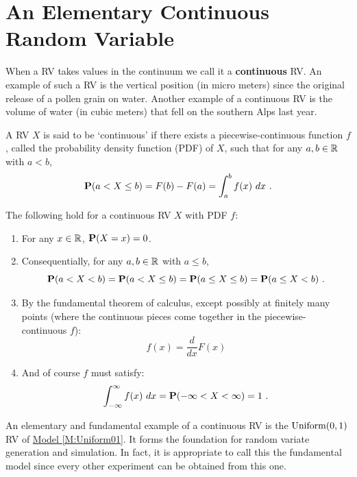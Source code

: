 \section{An Elementary Continuous Random Variable}\label{S:ElemContRV}

When a RV takes values in the continuum we call it a {\bf continuous} RV.  An example of such a RV is the vertical position (in micro meters) since the original release of a pollen grain on water.  Another example of a continuous RV is the volume of water (in cubic meters) that fell on the southern Alps last year.  
\begin{definition}
A RV $X$ is said to be `continuous' if there exists a piecewise-continuous function $f$, called the probability density function (PDF) of $X$, such that for any $a, b \in \mathbb{R}$ with $a < b$,
\[
\mathbf{P}(a < X \leq b) = F(b)-F(a) = \int_a^b f(x) \ dx \ .
\]
\end{definition}
The following hold for a continuous RV $X$ with PDF $f$:
\begin{enumerate}
\item For any $x \in \mathbb{R}$, $\mathbf{P}(X=x)=0$.
\item Consequentially, for any $a,b \in \mathbb{R}$ with $a \leq b$,
\[
\mathbf{P}(a < X < b ) = \mathbf{P}(a < X \leq b) = \mathbf{P}(a \leq X \leq b) = \mathbf{P}(a \leq X < b) \ .
\]
\item By the fundamental theorem of calculus, except possibly at finitely many points (where the continuous pieces come together in the piecewise-continuous $f$):
\[
f(x) = \frac{d}{dx} F(x)
\]
\item And of course $f$ must satisfy:
\[
\int_{-\infty}^{\infty} f(x) \ dx = \mathbf{P}(-\infty < X < \infty) = 1 \ .
\] 
\end{enumerate}

An elementary and fundamental example of a continuous RV is the $\mbox{{\rm Uniform}}(0,1)$ RV of \hyperref[M:Uniform01]{Model \ref*{M:Uniform01}}.  It forms the foundation for random variate generation and simulation.  In fact, it is appropriate to call this the fundamental model since every other experiment can be obtained from this one.

